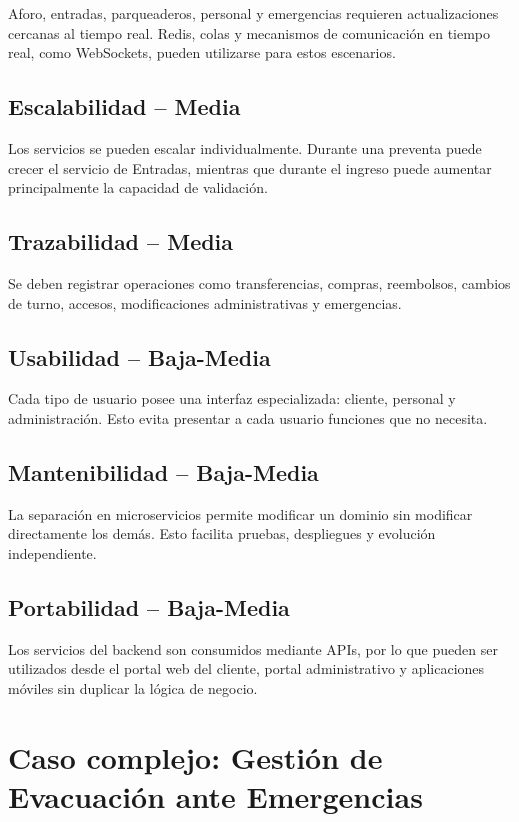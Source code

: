 \documentclass[12pt,a4paper]{article}
\begin{document}
Aforo, entradas, parqueaderos, personal y emergencias requieren actualizaciones cercanas al tiempo real. Redis, colas y mecanismos de comunicación en tiempo real, como WebSockets, pueden utilizarse para estos escenarios.

\subsection{Escalabilidad -- Media}

Los servicios se pueden escalar individualmente. Durante una preventa puede crecer el servicio de Entradas, mientras que durante el ingreso puede aumentar principalmente la capacidad de validación.

\subsection{Trazabilidad -- Media}

Se deben registrar operaciones como transferencias, compras, reembolsos, cambios de turno, accesos, modificaciones administrativas y emergencias.

\subsection{Usabilidad -- Baja-Media}

Cada tipo de usuario posee una interfaz especializada: cliente, personal y administración. Esto evita presentar a cada usuario funciones que no necesita.

\subsection{Mantenibilidad -- Baja-Media}

La separación en microservicios permite modificar un dominio sin modificar directamente los demás. Esto facilita pruebas, despliegues y evolución independiente.

\subsection{Portabilidad -- Baja-Media}

Los servicios del backend son consumidos mediante APIs, por lo que pueden ser utilizados desde el portal web del cliente, portal administrativo y aplicaciones móviles sin duplicar la lógica de negocio.

\section{Caso complejo: Gestión de Evacuación ante Emergencias}
\end{document}
